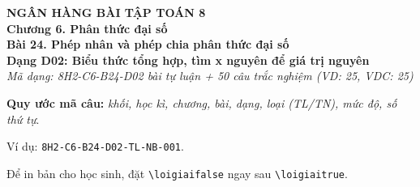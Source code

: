 \documentclass[12pt,a4paper]{article}
\newif\ifloigiai
\begin{document}
\begin{center}
{\Large\textbf{NGÂN HÀNG BÀI TẬP TOÁN 8}}\\[3pt]
\textbf{Chương 6. Phân thức đại số}\\[2pt]
\textbf{Bài 24. Phép nhân và phép chia phân thức đại số}\\[2pt]
\textbf{Dạng D02: Biểu thức tổng hợp, tìm x nguyên để giá trị nguyên}\\[2pt]
\textit{Mã dạng: 8H2-C6-B24-D02  bài tự luận + 50 câu trắc nghiệm \quad (VD: 25, VDC: 25)}
\end{center}
\textbf{Quy ước mã câu:} \textit{khối, học kì, chương, bài, dạng, loại (TL/TN), mức độ, số thứ tự}.\par Ví dụ: \texttt{8H2-C6-B24-D02-TL-NB-001}.\par Để in bản cho học sinh, đặt \verb|\loigiaifalse| ngay sau \verb|\loigiaitrue|.
\end{document}
